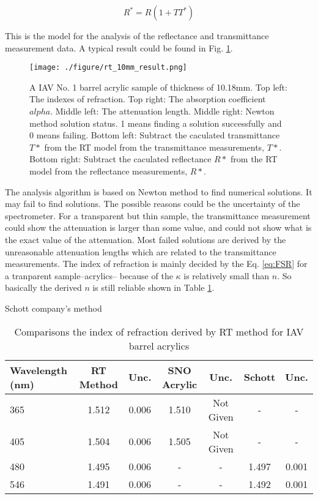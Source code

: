 \begin{equation}
\label{eq:RStar}
R^* = R(1+TT^*)
\end{equation}


This is the model for the analysis of the reflectance and transmittance measurement data.
A typical result could be found in Fig. \ref{fig:rt_10mm_result.png}.


\begin{figure}[p]
    \centering
    \texttt{[image: ./figure/rt\_10mm\_result.png]}
    \caption[Result of RT method]
{A IAV No. 1 barrel acrylic sample of thickness of 10.18mm.
Top left: The indexes of refraction.
Top right: The absorption coefficient $alpha$.
Middle left: The attenuation length.
Middle right: Newton method solution status. 1 means finding a solution successfully and 0 means failing.
Bottom left: Subtract the caculated transmittance $T*$ from the RT model from the transmittance measurements, $T*$.
Bottom right: Subtract the caculated reflectance $R*$ from the RT model from the reflectance measurements, $R*$.
}
    \label{fig:rt_10mm_result.png}
    \end{figure}

The analysis algorithm is based on Newton method to find numerical solutions. It may fail
to find solutions. The possible reasons could be the uncertainty of the spectrometer.
For a transparent but thin sample, the transmittance measurement could show the attenuation
is larger than some value, and could not show  what is the exact value of the attenuation.
Most failed solutions are derived by the unreasonable attenuation lengths which are related to the transmittance measurements.
The index of refraction is mainly decided by the Eq. \ref{eq:FSR} for a tranparent sample--acrylics-- because
of the $\kappa$ is relatively small than $n$. So basically the derived $n$ is still reliable shown in Table \ref{tab:RTMethodResult}.


Schott company's  method

\begin{table}
\centering
\caption{Comparisons the index of refraction derived by RT method for IAV barrel acrylics}
\label{tab:RTMethodResult}
\begin{tabular}{lcccccc}
\hline
Wavelength (nm) & RT Method & Unc. & SNO Acrylic & Unc. & Schott & Unc. \\
\hline
\hline
365 & 1.512 & 0.006 & 1.510 & Not Given & - & - \\
\hline
405 & 1.504 & 0.006 & 1.505 & Not Given & - & - \\
\hline
480 & 1.495 & 0.006 & - & - & 1.497 & 0.001 \\
\hline
546 & 1.491 & 0.006 & - & - & 1.492 & 0.001 \\
\hline
\end{tabular}
\end{table}


